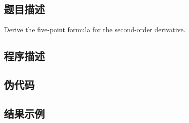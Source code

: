 \subsection{题目描述}
\noindent Derive the five-point formula for the second-order derivative.

\subsection{程序描述}


\subsection{伪代码}



\subsection{结果示例}

